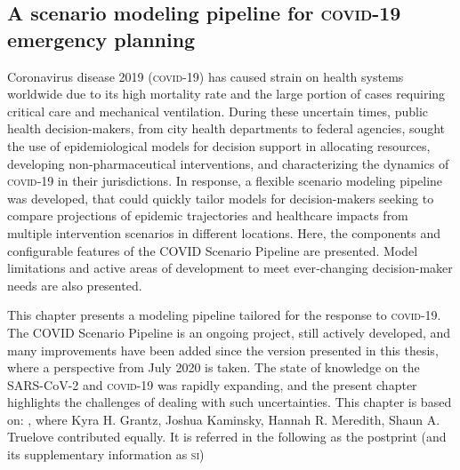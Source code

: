 \begin{fullwidth}
\chapter[A scenario modeling pipeline for \textsc{covid}-19 emergency planning]{A scenario modeling pipeline for \textsc{covid}-19 \\emergency planning}
\label{sec:covid-pipeline-reports}
Coronavirus disease 2019 (\textsc{covid}-19) has caused strain on health systems worldwide due to its high mortality rate and the large portion of cases requiring critical care and mechanical ventilation. During these uncertain times, public health decision-makers, from city health departments to federal agencies, sought the use of epidemiological models for decision support in allocating resources, developing non‑pharmaceutical interventions, and characterizing the dynamics of \textsc{covid}‑19 in their jurisdictions. In response, a flexible scenario modeling pipeline was developed, that could quickly tailor models for decision-makers seeking to compare projections of epidemic trajectories and healthcare impacts from multiple intervention scenarios in different locations. Here, the components and configurable features of the COVID  Scenario Pipeline are presented. Model limitations and active areas of development to meet ever‑changing decision-maker needs are also presented.
  
This chapter presents a modeling pipeline tailored for the response to \textsc{covid}-19. The COVID  Scenario Pipeline is an ongoing project, still actively developed, and many improvements have been added since the version presented in this thesis,  where a perspective from July 2020 is taken. The state of knowledge on the SARS-CoV-2 and \textsc{covid}-19 was rapidly expanding, and the present chapter highlights the challenges of dealing with such uncertainties. This chapter is based on:
, where Kyra H. Grantz, Joshua Kaminsky, Hannah R. Meredith, Shaun A. Truelove contributed equally. It is referred in the following as the postprint (and its supplementary information as \textsc{si})
  \end{fullwidth}


